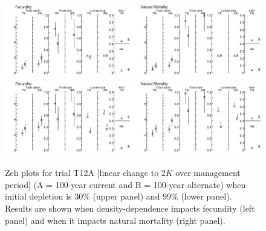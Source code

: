 \documentclass{article}\usepackage[]{graphicx}\usepackage[]{color}
\providecommand\phantomsection{}
\begin{document}
\begin{landscape}
\phantomsection
{}
\setcounter{figure}{0}


\begin{figure}[H]
\centering
\includegraphics[]{SC66aRMP10_Part2_T12A-R.jpeg}
\includegraphics[]{SC66aRMP10_Part2_T12A-D.jpeg}
\caption{
Zeh plots for trial T12A
[linear change to 2$K$ over management period]
(A = 100-year current and B = 100-year alternate)
when initial depletion is 30\% (upper panel) and 99\% (lower panel).
Results are shown when density-dependence impacts fecundity (left panel) and when it impacts natural mortality (right panel).
}
\end{figure}

\phantomsection
{}
\setcounter{figure}{0}



\end{landscape}
\end{document}

